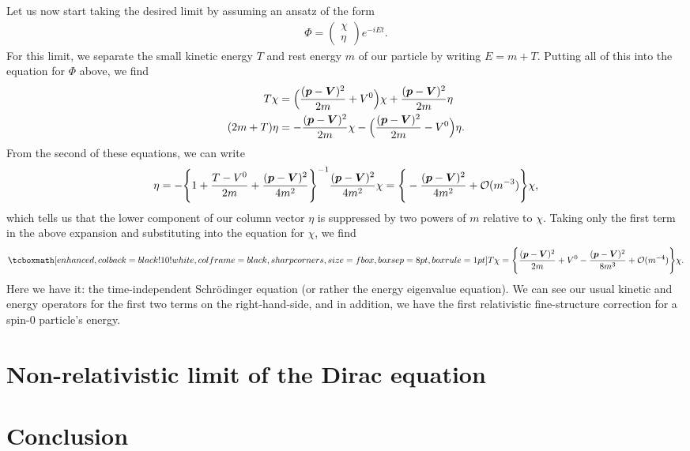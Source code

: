 Let us now start taking the desired limit by assuming an ansatz of the form
\begin{align}
    \Phi = 
    \begin{pmatrix}
        \chi \\ \eta
    \end{pmatrix}
    e^{-i E t}
.\end{align}
For this limit, we separate the small kinetic energy $T$ and rest energy $m$ of our particle by writing $E = m + T$.
Putting all of this into the equation for $\Phi$ above, we find
\begin{align}
    T \chi &= \Big( \frac{(\vb*{p} - \vb*{V})^2}{2m} + V^{0} \Big) \chi + \frac{(\vb*{p} - \vb*{V})^2}{2m} \eta \\
    (2 m + T) \eta &= -\frac{(\vb*{p} - \vb*{V})^2}{2m} \chi - \Big( \frac{(\vb*{p} - \vb*{V})^2}{2m} - V^{0} \Big) \eta
.\end{align}
From the second of these equations, we can write
\begin{align}
    \eta = - \Bigg\{ 1 + \frac{T - V^{0}}{2m} + \frac{(\vb*{p} - \vb*{V})^2}{4m^2}  \Bigg\}^{-1} \frac{(\vb*{p} - \vb*{V})^2}{4m^2} \chi = \Bigg\{ -\frac{(\vb*{p} - \vb*{V})^2}{4 m^2} + \mathcal{O}(m^{-3}) \Bigg\} \chi
,\end{align}
which tells us that the lower component of our column vector $\eta$ is suppressed by two powers of $m$ relative to $\chi$.
Taking only the first term in the above expansion and substituting into the equation for $\chi$, we find
\begin{align}
    \eqbox{T \chi = \Bigg\{ \frac{(\vb*{p} - \vb*{V})^2}{2m} + V^{0} - \frac{(\vb*{p} - \vb*{V})^2}{8m^3} + \mathcal{O}(m^{-4}) \Bigg\} \chi }
.\end{align}
Here we have it: the time-independent Schr\"{o}dinger equation (or rather the energy eigenvalue equation).
We can see our usual kinetic and energy operators for the first two terms on the right-hand-side, and in addition, we have the first relativistic fine-structure correction for a spin-0 particle's energy.


\section{Non-relativistic limit of the Dirac equation}
\label{sec:nr-limit-of-the-kg-equation}




\section{Conclusion}




    

